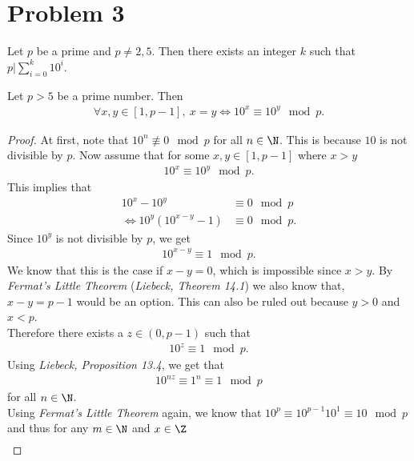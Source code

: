 \documentclass{article}
\begin{document}
\section*{Problem 3}
\begin{claim}
  Let $p$ be a prime and $p\not=2,5$. Then there exists an integer $k$ such that $p|\sum_{i=0}^k 10^i$.
\end{claim}
\begin{adjustwidth}{2em}{2em}
  \begin{lemma}
    \label{l2}
    Let $p>5$ be a prime number. Then 
    \begin{align*}
      \forall x,y\in[1,p-1],\: x=y \Leftrightarrow 10^x\equiv 10^y\mod p.
    \end{align*}
  \end{lemma} 
  \begin{proof}
    At first, note that $10^n \not\equiv 0 \mod p$ for all $n\in\N$.
    This is because $10$ is not divisible by $p$. 
    Now assume that for some $x,y\in[1,p-1]$ where $x>y$
    \begin{align*}
      10^x \equiv 10^y \mod p.
    \end{align*}
    This implies that
    \begin{align*}
      10^x-10^y&\equiv 0\mod p\\
      \Leftrightarrow 10^y(10^{x-y}-1)&\equiv 0 \mod p.
    \end{align*}
    Since $10^y$ is not divisible by $p$, we get
    \begin{align*}
      10^{x-y}\equiv 1 \mod p.
    \end{align*}
    We know that this is the case if $x-y=0$, which is impossible since $x>y$.
    By \emph{Fermat's Little Theorem} (\emph{Liebeck, Theorem 14.1}) we also know that, $x-y=p-1$ would be an option.
    This can also be ruled out because $y>0$ and $x<p$.\\
    Therefore there exists a $z\in(0,p-1)$ such that
    \begin{align*}
      10^z \equiv 1 \mod p.
    \end{align*}
    Using \emph{Liebeck, Proposition 13.4}, we get that
    \begin{align*}
      10^{nz}\equiv 1^n\equiv 1 \mod p
    \end{align*}
    for all $n\in\N$. \\
    Using \emph{Fermat's Little Theorem} again, we know that $10^p\equiv 10^{p-1}10^1\equiv 10\mod p$ and thus for any $m\in\N$ and $x\in\Z$
    \begin{align*}

\end{align*}
\end{proof}
\end{adjustwidth}
\end{document}
